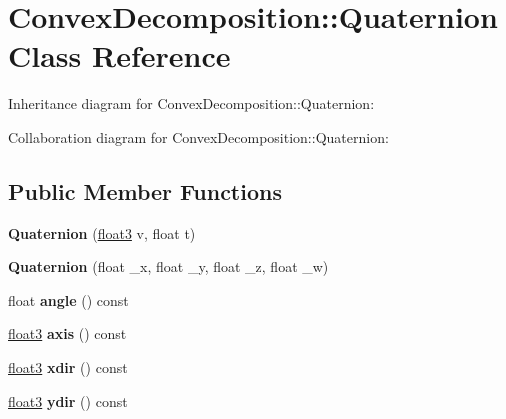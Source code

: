 \hypertarget{class_convex_decomposition_1_1_quaternion}{\section{Convex\+Decomposition\+:\+:Quaternion Class Reference}
\label{class_convex_decomposition_1_1_quaternion}
}


Inheritance diagram for Convex\+Decomposition\+:\+:Quaternion\+:


Collaboration diagram for Convex\+Decomposition\+:\+:Quaternion\+:
\subsection*{Public Member Functions}
\begin{DoxyCompactItemize}
\item 
\hypertarget{class_convex_decomposition_1_1_quaternion_a052be630dcb3ea0bf2de5400070d6028}{{\bfseries Quaternion} (\hyperlink{class_convex_decomposition_1_1float3}{float3} v, float t)}\label{class_convex_decomposition_1_1_quaternion_a052be630dcb3ea0bf2de5400070d6028}

\item 
\hypertarget{class_convex_decomposition_1_1_quaternion_a1682e40195657b1bf69a2192ed0030bb}{{\bfseries Quaternion} (float \+\_\+x, float \+\_\+y, float \+\_\+z, float \+\_\+w)}\label{class_convex_decomposition_1_1_quaternion_a1682e40195657b1bf69a2192ed0030bb}

\item 
\hypertarget{class_convex_decomposition_1_1_quaternion_a15edd3fc9685914ce7169d15d2ae6a63}{float {\bfseries angle} () const }\label{class_convex_decomposition_1_1_quaternion_a15edd3fc9685914ce7169d15d2ae6a63}

\item 
\hypertarget{class_convex_decomposition_1_1_quaternion_a0f0119aa1fc6b6df1e8ebacfc2ba76bd}{\hyperlink{class_convex_decomposition_1_1float3}{float3} {\bfseries axis} () const }\label{class_convex_decomposition_1_1_quaternion_a0f0119aa1fc6b6df1e8ebacfc2ba76bd}

\item 
\hypertarget{class_convex_decomposition_1_1_quaternion_a25c21a51e8d342e7955f219886683a5b}{\hyperlink{class_convex_decomposition_1_1float3}{float3} {\bfseries xdir} () const }\label{class_convex_decomposition_1_1_quaternion_a25c21a51e8d342e7955f219886683a5b}

\item 
\hypertarget{class_convex_decomposition_1_1_quaternion_a5eccd9e425187e600a6d6fa46be34433}{\hyperlink{class_convex_decomposition_1_1float3}{float3} {\bfseries ydir} () const }\label{class_convex_decomposition_1_1_quaternion_a5eccd9e425187e600a6d6fa46be34433}


\end{DoxyCompactItemize}
